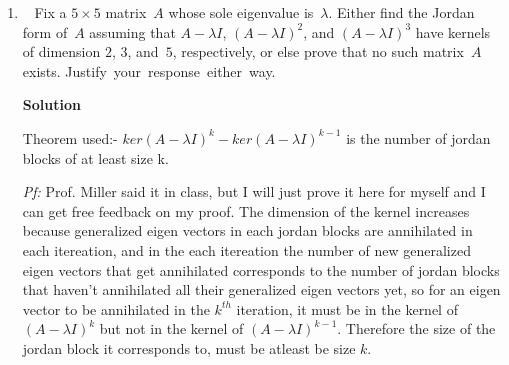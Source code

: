 \documentclass[11pt]{article}
\newcommand\score[1]{\marginpar{\vspace{-2ex}\color{blue}{#1/14}}\hspace{-1ex}}
\newcommand\0{\mathbf{0}}
\newcommand\<{\langle}
\renewcommand\>{\rangle}
\begin{document}
\begin{enumerate}
At this point we have either exhausted all the elements in the field, or there is another element $x$ that 
can't be described as a linear combination of all the elments we have seen so far, but this 
is analogous to the argument above with the new element being $x$, and we can keep repeating this argument, each time increasing the number
of elements by a power of $p$, until we reach $q=p^n$.

Note: The main idea of my proof is that each time I encounter a new element that can't be described
as a linear combination of the elements I have seen so far, then it must increase the number of elmeents 
I have so far, by $p$. I tried to prove that the set $g, g+1, g+2,... , g+p-1$ is closed under multiplication,
but I couldn't prove it unless $g^{-1} = g$, I don't know if this claim is true or not, but I think it is 
true because when you have a chain of $g*g*g*...*g=1$, you can brake it up in the middle to get $g*g*...*g=(g*g*...*g)^{-1}$,
but this proof would rely on the chain of multiplication having even length, and I don't know if that is true or not for every finite field.

\pagebreak

\item\ \score{}%
Fix a $5 \times 5$ matrix~$A$ whose sole eigenvalue is~$\lambda$.
Either find the Jordan form of~$A$ assuming that $A - \lambda I$, $(A
- \lambda I)^2$, and $(A - \lambda I)^3$ have kernels of dimension
$2$, $3$, and~$5$, respectively, or else prove that no such matrix~$A$
exists.  \mbox{Justify your response either way}.

\textbf{Solution}

Theorem used:- $ker(A-\lambda I)^k -  ker(A-\lambda I)^{k-1}$ is the number of jordan blocks of at least size k.

\textit{Pf:} Prof. Miller said it in class, but I will just prove it here for myself and I can
get free feedback on my proof. The dimension of the kernel increases because generalized eigen vectors in each jordan
blocks are annihilated in each itereation, and in the each itereation the number of new generalized eigen vectors
that get annihilated corresponds to the number of jordan blocks that haven't annihilated all their 
generalized eigen vectors yet, so for an eigen vector to be annihilated in the $k^{th}$ iteration, it must be in the kernel of $(A-\lambda I)^k$ but not in the kernel of $(A-\lambda I)^{k-1}$. 
Therefore the size of the jordan block it corresponds to, must be atleast be size $k$.


\end{enumerate}
\end{document}
